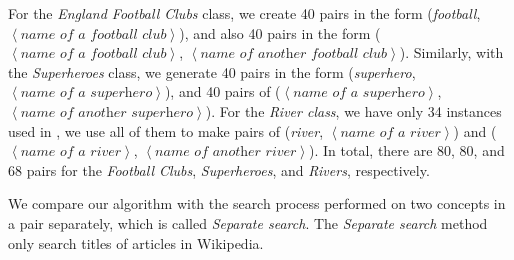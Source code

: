 For the {\em England Football Clubs} class, we create 40 pairs in the
form ({\em football}, $\left < \textit{name of a football club} \right
>$), and also 40 pairs in the form ($\left < \textit{name of a
    football club} \right >$, \linebreak[4] $\left < \textit{name of another
    football club} \right >$). Similarly, with the {\em Superheroes}
class, we generate 40 pairs in the form ({\em superhero}, $\left <
  \textit{name of a superhero} \right >$), and 40 pairs of ($\left <
  \textit{name of a superhero} \right >$, $\left < \textit{name of
    another superhero} \right >$). For the {\em River class}, we have
only 34 instances used in \cite{VyasPantel09}, we use all of them to
make pairs of ({\em river}, $\left < \textit{name of a river} \right
>$) and ($\left < \textit{name of a river} \right >$, $\left <
  \textit{name of another river} \right >$). In total, there are 80,
80, and 68 pairs for the {\em Football Clubs}, {\em Superheroes}, and
{\em Rivers}, respectively.

We compare our algorithm with the search process performed on two
concepts in a pair separately, which is called {\em Separate
  search}. The {\em Separate search} method only search titles of
articles in Wikipedia.


